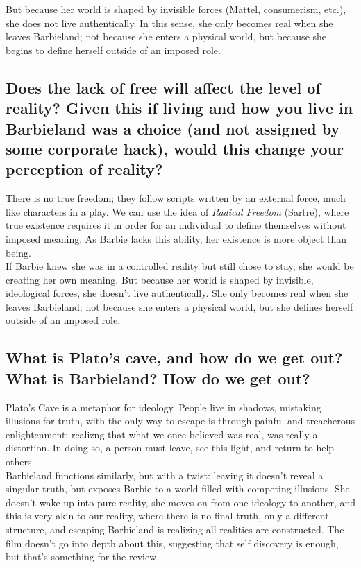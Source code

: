 But because her world is shaped by invisible forces (Mattel, consumerism, etc.), 
she does not live authentically. In this sense, she only becomes real when she 
leaves Barbieland; not because she enters a physical world, but because she 
begins to define herself outside of an imposed role. \\ 

\subsection{Does the lack of free will affect the level of reality? Given this if living and
how you live in Barbieland was a choice (and not assigned by some corporate hack), would this change
your perception of reality?}

There is no true freedom; they follow scripts written by an external force, much like characters in a play. 
We can use the idea of \textit{Radical Freedom} (Sartre), where true existence requires it in order for an individual 
to define themselves without imposed meaning. As Barbie lacks this ability, her existence is more object
than being. \\

If Barbie knew she was in a controlled reality but still chose to stay, she would be creating her own meaning.
But because her world is shaped by invisible, ideological forces, she doesn't live authentically. She only becomes
real when she leaves Barbieland; not because she enters a physical world, but she defines herself outside of an imposed role. \\

\subsection{What is Plato's cave, and how do we get out? What is Barbieland? How do we get out?}

Plato's Cave is a metaphor for ideology. People live in shadows, mistaking illusions for truth, with
the only way to escape is through painful and treacherous enlightenment; realizng that 
what we once believed was real, was really a distortion. In doing so, a person must leave, see this light, and
return to help others. \\

Barbieland functions similarly, but with a twist: leaving it doesn't reveal a singular truth, but exposes Barbie to a world
filled with competing illusions. She doesn't wake up into pure reality, she moves on from one 
ideology to another, and this is very akin to our reality, where there is no final truth, 
only a different structure, and escaping Barbieland is realizing all realities are constructed.
The film doesn't go into depth about this, suggesting that self discovery is enough, but that's something for the review. \\

